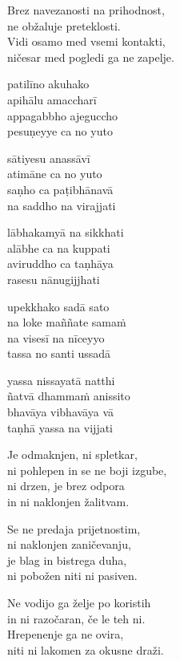 Brez navezanosti na prihodnost,\\
ne obžaluje preteklosti.\\
Vidi osamo med vsemi kontakti,\\
ničesar med pogledi ga ne zapelje.


\clearpage

patilīno akuhako\\
apihālu amaccharī\\
appagabbho ajeguccho\\
pesuṇeyye ca no yuto

sātiyesu anassāvī\\
atimāne ca no yuto\\
saṇho ca paṭibhānavā\\
na saddho na virajjati

lābhakamyā na sikkhati\\
alābhe ca na kuppati\\
aviruddho ca taṇhāya\\
rasesu nānugijjhati

upekkhako sadā sato\\
na loke maññate samaṁ\\
na visesī na nīceyyo\\
tassa no santi ussadā

yassa nissayatā natthi\\
ñatvā dhammaṁ anissito\\
bhavāya vibhavāya vā\\
taṇhā yassa na vijjati


\clearpage

Je odmaknjen, ni spletkar,\\
ni pohlepen in se ne boji izgube,\\
ni drzen, je brez odpora\\
in ni naklonjen žalitvam.

Se ne predaja prijetnostim,\\
ni naklonjen zaničevanju,\\
je blag in bistrega duha,\\
ni pobožen niti ni pasiven.

Ne vodijo ga želje po koristih\\
in ni razočaran, če le teh ni.\\
Hrepenenje ga ne ovira,\\
niti ni lakomen za okusne draži.

